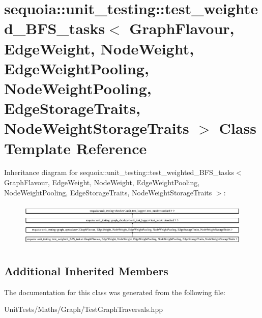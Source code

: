 \hypertarget{classsequoia_1_1unit__testing_1_1test__weighted___b_f_s__tasks}{}\section{sequoia\+::unit\+\_\+testing\+::test\+\_\+weighted\+\_\+\+B\+F\+S\+\_\+tasks$<$ Graph\+Flavour, Edge\+Weight, Node\+Weight, Edge\+Weight\+Pooling, Node\+Weight\+Pooling, Edge\+Storage\+Traits, Node\+Weight\+Storage\+Traits $>$ Class Template Reference}
\label{classsequoia_1_1unit__testing_1_1test__weighted___b_f_s__tasks}
Inheritance diagram for sequoia\+::unit\+\_\+testing\+::test\+\_\+weighted\+\_\+\+B\+F\+S\+\_\+tasks$<$ Graph\+Flavour, Edge\+Weight, Node\+Weight, Edge\+Weight\+Pooling, Node\+Weight\+Pooling, Edge\+Storage\+Traits, Node\+Weight\+Storage\+Traits $>$\+:\begin{figure}[H]
\begin{center}
\leavevmode
\includegraphics[height=2.157996cm]{classsequoia_1_1unit__testing_1_1test__weighted___b_f_s__tasks}
\end{center}
\end{figure}
\subsection*{Additional Inherited Members}


The documentation for this class was generated from the following file\+:\begin{DoxyCompactItemize}
\item 
Unit\+Tests/\+Maths/\+Graph/Test\+Graph\+Traversals.\+hpp\end{DoxyCompactItemize}
